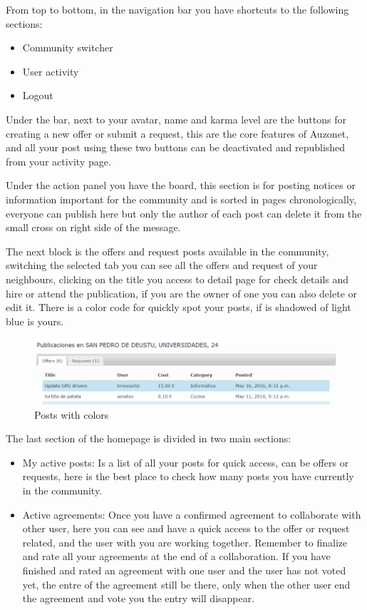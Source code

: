 \documentclass{DeustoFDP}
\begin{document}
From top to bottom, in the navigation bar you have shortcuts to the following sections:
\begin{itemize}
	\item Community switcher
	\item User activity
	\item Logout
\end{itemize}

Under the bar, next to your avatar, name and karma level are the buttons for creating a new offer or submit a request, this are the core features of Auzonet, and all your post using these two buttons can be deactivated and republished from your activity page.

Under the action panel you have the board, this section is for posting notices or information important for the community and is sorted in pages chronologically, everyone can publish here but only the author of each post can delete it from the small cross on right side of the message.

The next block is the offers and request posts available in the community, switching the selected tab you can see all the offers and request of your neighbours, clicking on the title you access to detail page for check details and hire or attend the publication, if you are the owner of one you can also delete or edit it.
There is a color code for quickly spot your posts, if is shadowed of light blue is yours.

\begin{figure}[h!]
\centering
\includegraphics[width=0.9\linewidth]{fig/Manual/colors}
\caption[Posts with colors]{Posts with colors}
\label{fig:colors}
\end{figure}


The last section of the homepage is divided in two main sections:
\begin{itemize}
	\item My active posts: Is a list of all your posts for quick access, can be offers or requests, here is the best place to check how many posts you have currently in the community. 
	\item Active agreements: Once you have a confirmed agreement to collaborate with other user, here you can see and have a quick access to the offer or request related, and the user with you are working together. Remember to finalize and rate all your agreements at the end of a collaboration. If you have finished and rated an agreement with one user and the user has not voted yet, the entre of the agreement still be there, only when the other user end the agreement and vote you the entry will disappear.

\end{itemize}
\newpage
\end{document}
